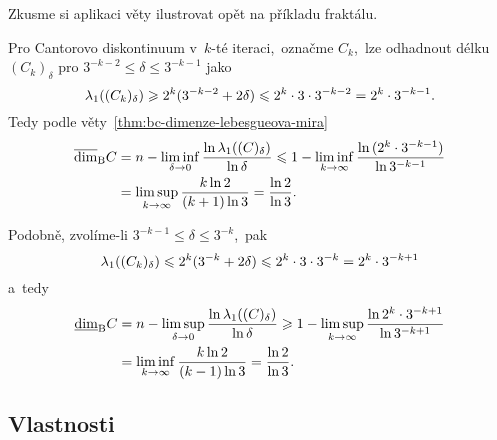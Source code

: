 Zkusme si aplikaci věty ilustrovat opět na příkladu fraktálu.
\begin{example}\label{ex:cantorovo-diskontinuum-potreti}
    Pro Cantorovo diskontinuum v~$k$-té iteraci,~označme $C_k$,~lze odhadnout délku $(C_k)_\delta$ pro $3^{-k-2}\leqslant\delta\leqslant 3^{-k-1}$ jako
    \[\lambda_1((C_k)_\delta)\geqslant 2^k(3^{-k-2}+2\delta)\leqslant2^k\cdot 3\cdot 3^{-k-2}=2^k\cdot 3^{-k-1}.\]
    Tedy podle věty~\ref{thm:bc-dimenze-lebesgueova-mira}
    \begin{align*}
        \overline{\dim}_\textup{B}{C}&=n-\liminf_{\delta\to 0}\dfrac{\ln{\ensuremath{\lambda_1}((C)_\delta)}}{\ln{\delta}}\leqslant1-\liminf_{k\to\infty}\dfrac{\ln{(2^{k}\cdot 3^{-k-1})}}{\ln{3^{-k-1}}}\\
        &=\limsup_{k\to\infty}\dfrac{k\ln{2}}{(k+1)\ln{3}}=\dfrac{\ln{2}}{\ln{3}}.
    \end{align*}

    Podobně, zvolíme-li $3^{-k-1}\leqslant\delta\leqslant 3^{-k}$,~pak
    \[\lambda_1((C_k)_\delta)\leqslant 2^k(3^{-k}+2\delta)\leqslant2^k\cdot 3\cdot 3^{-k}=2^k\cdot 3^{-k+1}\]
    a~tedy
    \begin{align*}
        \underline{\dim}_\textup{B}{C}&=n-\limsup_{\delta\to 0}\dfrac{\ln{\ensuremath{\lambda_1}((C)_\delta)}}{\ln{\delta}}\geqslant 1-\limsup_{k\to\infty}\dfrac{\ln{2^{k}\cdot 3^{-k+1}}}{\ln{3^{-k+1}}}\\
        &=\liminf_{k\to\infty}\dfrac{k\ln{2}}{(k-1)\ln{3}}=\dfrac{\ln{2}}{\ln{3}}.
    \end{align*}
\end{example}

\subsection{Vlastnosti}\label{subsec:vlastnosti-bc-dimenze}


